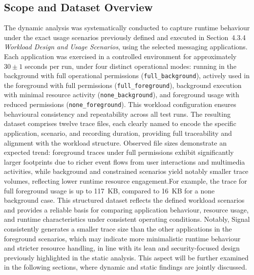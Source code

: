 \documentclass[a4paper,12pt]{report}
\begin{document}
\subsection{Scope and Dataset Overview}

The dynamic analysis was systematically conducted to capture runtime behaviour
under the exact usage scenarios previously defined and executed in Section~4.3.4
\textit{Workload Design and Usage Scenarios}, using the selected messaging applications.
Each application was exercised in a controlled environment for approximately $30 \pm 1$
seconds per run, under four distinct operational modes: running in the background with full
operational permissions (\texttt{full\_background}), actively used in the foreground with full
permissions (\texttt{full\_foreground}), background execution with minimal resource activity
(\texttt{none\_background}), and foreground usage with reduced permissions (\texttt{none\_foreground}).
This workload configuration ensures behavioural consistency and repeatability across all test runs.
The resulting dataset comprises twelve trace files, each clearly named to encode the specific
application, scenario, and recording duration, providing full traceability and alignment with
the workload structure. Observed file sizes demonstrate an expected trend: foreground traces
under full permissions exhibit significantly larger footprints due to richer event flows from
user interactions and multimedia activities, while background and constrained scenarios yield
notably smaller trace volumes, reflecting lower runtime resource engagement.For example, the
trace for full foreground usage is up to 117~KB, compared to 16~KB for a none background case.
This structured dataset reflects the defined workload scenarios and provides a reliable basis
for comparing application behaviour, resource usage, and runtime characteristics under consistent
operating conditions. Notably, Signal consistently generates a smaller trace size than the other
applications in the foreground scenarios, which may indicate more minimalistic runtime behaviour
and stricter resource handling, in line with its lean and security-focused design previously
highlighted in the static analysis. This aspect will be further examined in the following sections,
where dynamic and static findings are jointly discussed.
\end{document}
